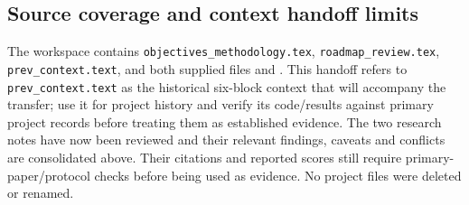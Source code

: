 \documentclass[10pt,a4paper]{article}
\begin{document}
\subsection{Source coverage and context handoff limits}
The workspace contains \texttt{objectives\_methodology.tex}, \texttt{roadmap\_review.tex}, \texttt{prev\_context.text}, and both supplied files  and . This handoff refers to \texttt{prev\_context.text} as the historical six-block context that will accompany the transfer; use it for project history and verify its code/results against primary project records before treating them as established evidence. The two research notes have now been reviewed and their relevant findings, caveats and conflicts are consolidated above. Their citations and reported scores still require primary-paper/protocol checks before being used as evidence. No project files were deleted or renamed.
\end{document}
